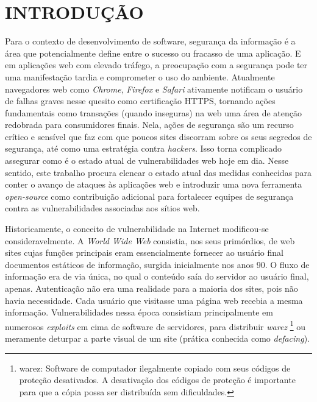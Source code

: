 \chapter{INTRODUÇÃO}

Para o contexto de desenvolvimento de software, segurança da informação é a área que potencialmente define entre o sucesso ou fracasso de uma aplicação. E em aplicações web com elevado tráfego, a preocupação com a segurança pode ter uma manifestação tardia e comprometer o uso do ambiente. Atualmente navegadores web como \textit{Chrome}, \textit{Firefox} e \textit{Safari} ativamente notificam o usuário de falhas graves nesse quesito como certificação HTTPS, tornando ações fundamentais como transações (quando inseguras) na web uma área de atenção redobrada para consumidores finais. Nela, ações de segurança são um recurso crítico e sensível que faz com que poucos sites discorram sobre os seus segredos de segurança, até como uma estratégia contra \textit{hackers}. Isso torna complicado assegurar como é o estado atual de vulnerabilidades web hoje em dia. Nesse sentido, este trabalho procura elencar o estado atual das medidas conhecidas para conter o avanço de ataques às aplicações web e introduzir uma nova ferramenta \textit{open-source} como contribuição adicional para fortalecer equipes de segurança contra as vulnerabilidades associadas aos sítios web. 

Historicamente, o conceito de vulnerabilidade na Internet modificou-se consideravelmente. A \textit{World Wide Web} consistia, nos seus primórdios, de web sites cujas funções principais eram essencialmente fornecer ao usuário final documentos estáticos de informação, surgida inicialmente nos anos 90. O fluxo de informação era de via única, no qual o conteúdo saía do servidor ao usuário final, apenas. Autenticação não era uma realidade para a maioria dos sites, pois não havia necessidade. Cada usuário que visitasse uma página web recebia a mesma informação. \cite{stuttard_web_nodate} Vulnerabilidades nessa época consistiam principalmente em numerosos \textit{exploits} em cima de software de servidores, para distribuir \textit{warez} \footnote{warez: Software de computador ilegalmente copiado com seus códigos de proteção desativados. A desativação dos códigos de proteção é importante para que a cópia possa ser distribuída sem dificuldades.} ou meramente deturpar a parte visual de um site (prática conhecida como \textit{defacing}).


